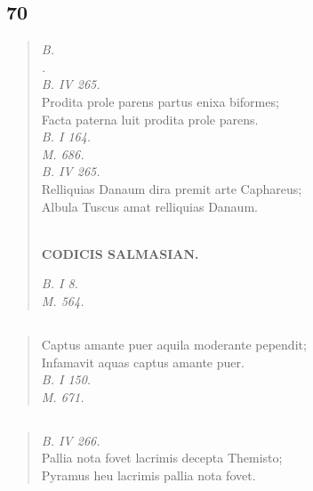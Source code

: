 \documentclass[11pt, a4paper]{report}
\begin{document}
            \subsection*{70}
      \begin{verse}
      \textit{B.} \\ \textit{.} \\ \textit{B. IV 265.} \\ Prodita prole parens partus enixa biformes; \\ Facta paterna luit prodita prole parens. \\ \textit{B. I 164.} \\ \textit{M. 686.} \\ \textit{B. IV 265.} \\ Relliquias Danaum dira premit arte Caphareus; \\ Albula Tuscus amat relliquias Danaum. \\ 
        ﻿\pagebreak 
    \begin{center} \textbf{CODICIS SALMASIAN.} \end{center} \marginpar{[109]} \textit{B. I 8.} \\ \textit{M. 564.} \\ 
      \end{verse}
  
            \subsection*{}
      \begin{verse}
      Captus amante puer aquila moderante pependit; \\ Infamavit aquas captus amante puer. \\ \textit{B. I 150.} \\ \textit{M. 671.} \\ 
      \end{verse}
  
            \subsection*{}
      \begin{verse}
      \textit{B. IV 266.} \\ Pallia nota fovet lacrimis decepta Themisto; \\ Pyramus heu lacrimis pallia nota fovet. \\ 
      \end{verse}
  
\end{document}
